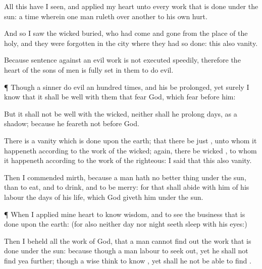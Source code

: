 {\par }{\PP {}All this have I
seen, and
applied my
heart unto every
work that is
done under the
sun:
{} a
time wherein one
man
ruleth over another to his own
hurt.

And
so I
saw the
wicked
buried, who had
come and
gone from the
place of the
holy, and they were
forgotten in the
city where they had so
done: this
{} also
vanity.

Because
sentence against an
evil
work is not
executed
speedily, therefore the
heart of the
sons of
men is fully
set in them to
do
evil.


\par }{\PP {}¶ Though a
sinner
do
evil an hundred
times, and his
{} be
prolonged, yet surely I
know that it shall be
well with them that
fear
God, which
fear
before him:

But it shall not be
well with the
wicked, neither shall he
prolong
{}
days,
{} as a
shadow; because he
feareth not
before
God.


\par }{\PP {}There
is a
vanity which is
done upon the
earth; that there be
just
{}, unto whom it
happeneth according to the
work of the
wicked; again, there
be
wicked
{}, to whom it
happeneth according to the
work of the
righteous: I
said that this
also
{}
vanity.

Then I
commended
mirth, because a
man hath no better
thing under the
sun, than to
eat, and to
drink, and to be
merry: for that shall
abide with him of his
labour the
days of his
life, which
God
giveth him under the
sun.


\par }{\PP {}¶ When I
applied mine
heart to
know
wisdom, and to
see the
business that is
done upon the
earth: (for also
{} neither
day nor
night
seeth
sleep with his
eyes:)

Then I
beheld all the
work of
God, that a
man
cannot find
out the
work that is
done under the
sun:
because
though a
man
labour to seek
{}
out, yet he shall not
find
{} yea further; though a
wise
{}
think to
know
{}, yet shall he not be
able to
find
{}.




\par }

